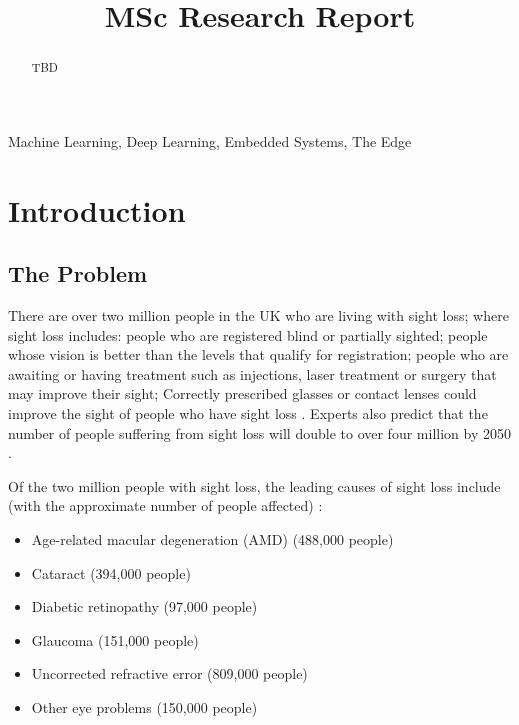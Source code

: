 \documentclass[conference]{IEEEtran}
\begin{document}
\title{MSc Research Report\\}

\author{
}

\maketitle

\begin{abstract}
TBD
\end{abstract}

\begin{IEEEkeywords}
Machine Learning, Deep Learning, Embedded Systems, The Edge
\end{IEEEkeywords}

\section{Introduction}
\subsection{The Problem}
There are over two million people in the UK who are living with sight loss; where sight loss includes: people who are registered blind or partially sighted; people whose vision is better than the levels that qualify for registration; people who are awaiting or having treatment such as injections, laser treatment or surgery that may improve their sight; Correctly prescribed glasses or contact lenses could improve the sight of people who have sight loss \cite{rnib}. Experts also predict that the number of people suffering from sight loss will double to over four million by 2050 \cite{Pezzullo}.

Of the two million people with sight loss, the leading causes of sight loss include (with the approximate number of people affected) \cite{rnib}:
\begin{itemize}
    \item Age-related macular degeneration (AMD) (488,000 people)
    \item Cataract (394,000 people)
    \item Diabetic retinopathy (97,000 people)
    \item Glaucoma (151,000 people)
    \item Uncorrected refractive error (809,000 people)
    \item Other eye problems (150,000 people)
\end{itemize}
\end{document}
